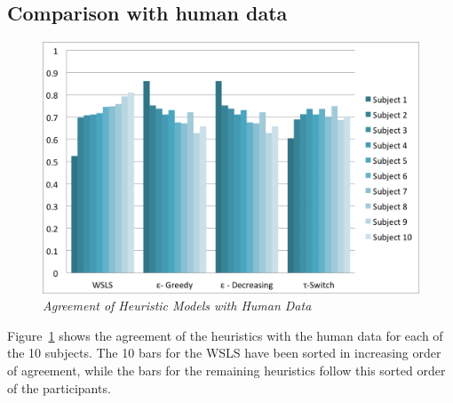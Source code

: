 \subsection{Comparison with human data}
\begin{figure}[H]
\begin{center}
\includegraphics[scale=0.5]{humanVsHeuristicNoTitle}
\caption{\small \sl \label{plot2} Agreement of Heuristic Models with Human Data}
\end{center}
\end{figure}

Figure~\ref{plot2} shows the agreement of the heuristics with the human data for each of the 10 subjects. The 10 bars for the WSLS have been sorted in increasing order of agreement, while the bars for the remaining heuristics follow this sorted order of the participants.
